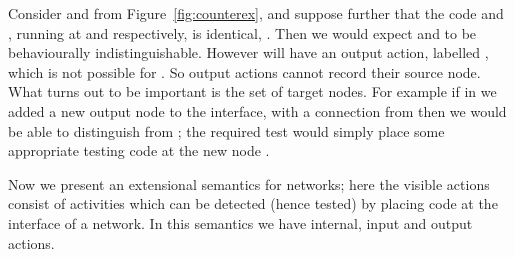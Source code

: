 \documentclass{LMCS}
\begin{document}
Consider  and  from
Figure~\ref{fig:counterex}, and suppose further that the code  and
, running at  and  respectively, is identical,
  .  Then we would expect  and
   to be behaviourally indistinguishable.  However 
 will have an output action, labelled , which is
not possible for .  So output actions cannot record
their source node. What  turns out to be important is the set of target
nodes.  For example if in  we added a new output node  to
the interface, with a connection from  then we would be able to
distinguish  from ; the required test
would simply place some appropriate testing code at the new node .

Now we present an extensional semantics for networks; here the
visible actions consist of activities which can be detected (hence
tested) by placing code at the interface of a network. In this
semantics we have internal, input and output actions.
\end{document}
